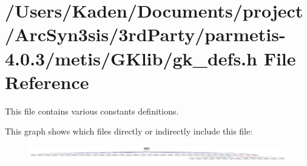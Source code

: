 \hypertarget{a00044}{}\section{/\+Users/\+Kaden/\+Documents/project/\+Arc\+Syn3sis/3rd\+Party/parmetis-\/4.0.3/metis/\+G\+Klib/gk\+\_\+defs.h File Reference}
\label{a00044}


This file contains various constants definitions.  


This graph shows which files directly or indirectly include this file\+:\nopagebreak
\begin{figure}[H]
\begin{center}
\leavevmode
\includegraphics[width=350pt]{a00046}
\end{center}
\end{figure}
